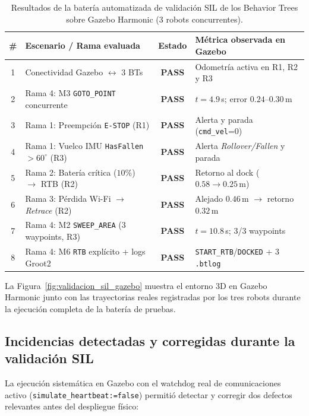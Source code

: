 \begin{table}[htbp]
    \centering
    \caption{Resultados de la batería automatizada de validación SIL de los Behavior Trees sobre Gazebo Harmonic (3 robots concurrentes).}
    \label{tab:resultados_sil_gazebo}
    \footnotesize
    \begin{tabular}{clcl}
        \toprule
        \textbf{\#} & \textbf{Escenario / Rama evaluada} & \textbf{Estado} & \textbf{Métrica observada en Gazebo} \\
        \midrule
        1 & Conectividad Gazebo $\leftrightarrow$ 3 BTs & \textbf{PASS} & Odometría activa en R1, R2 y R3 \\
        2 & Rama 4: M3 \texttt{GOTO\_POINT} concurrente & \textbf{PASS} & $t=4.9$\,s; error $0.24$--$0.30$\,m \\
        3 & Rama 1: Preempción \texttt{E-STOP} (R1) & \textbf{PASS} & Alerta y parada (\texttt{cmd\_vel}=0) \\
        4 & Rama 1: Vuelco IMU \texttt{HasFallen} $>60^\circ$ (R3) & \textbf{PASS} & Alerta \textit{Rollover/Fallen} y parada \\
        5 & Rama 2: Batería crítica ($10\%$) $\rightarrow$ RTB (R2) & \textbf{PASS} & Retorno al dock ($0.58 \rightarrow 0.25$\,m) \\
        6 & Rama 3: Pérdida Wi-Fi $\rightarrow$ \textit{Retrace} (R2) & \textbf{PASS} & Alejado $0.46$\,m $\rightarrow$ retorno $0.32$\,m \\
        7 & Rama 4: M2 \texttt{SWEEP\_AREA} (3 waypoints, R3) & \textbf{PASS} & $t=10.8$\,s; 3/3 waypoints \\
        8 & Rama 4: M6 \texttt{RTB} explícito + logs Groot2 & \textbf{PASS} & \texttt{START\_RTB}/\texttt{DOCKED} + 3 \texttt{.btlog} \\
        \bottomrule
    \end{tabular}
\end{table}

La Figura~\ref{fig:validacion_sil_gazebo} muestra el entorno 3D en Gazebo Harmonic junto con las trayectorias reales registradas por los tres robots durante la ejecución completa de la batería de pruebas.

\subsection{Incidencias detectadas y corregidas durante la validación SIL}

La ejecución sistemática en Gazebo con el watchdog real de comunicaciones activo (\texttt{simulate\_heartbeat:=false}) permitió detectar y corregir dos defectos relevantes antes del despliegue físico:

